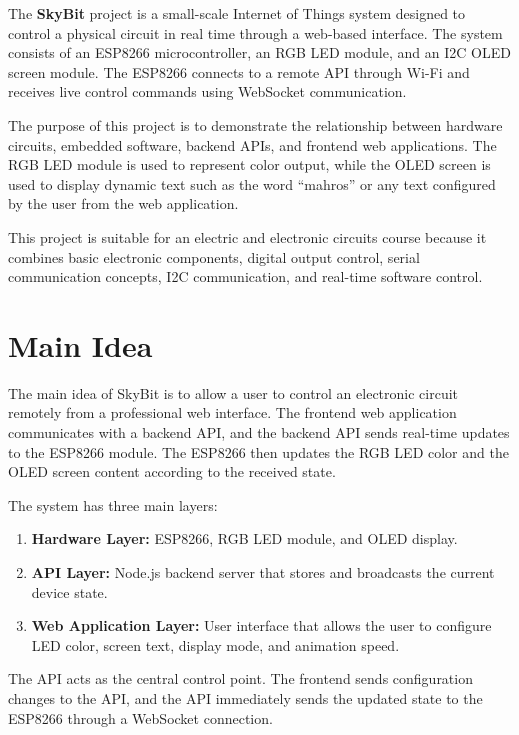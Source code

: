 \documentclass[12pt,a4paper]{report}
\begin{document}
The \textbf{SkyBit} project is a small-scale Internet of Things system designed to control a physical circuit in real time through a web-based interface. The system consists of an ESP8266 microcontroller, an RGB LED module, and an I2C OLED screen module. The ESP8266 connects to a remote API through Wi-Fi and receives live control commands using WebSocket communication.

The purpose of this project is to demonstrate the relationship between hardware circuits, embedded software, backend APIs, and frontend web applications. The RGB LED module is used to represent color output, while the OLED screen is used to display dynamic text such as the word ``mahros'' or any text configured by the user from the web application.

This project is suitable for an electric and electronic circuits course because it combines basic electronic components, digital output control, serial communication concepts, I2C communication, and real-time software control.

\chapter{Main Idea}

The main idea of SkyBit is to allow a user to control an electronic circuit remotely from a professional web interface. The frontend web application communicates with a backend API, and the backend API sends real-time updates to the ESP8266 module. The ESP8266 then updates the RGB LED color and the OLED screen content according to the received state.

The system has three main layers:

\begin{enumerate}[label=\textbf{\arabic*.}]
    \item \textbf{Hardware Layer:} ESP8266, RGB LED module, and OLED display.
    \item \textbf{API Layer:} Node.js backend server that stores and broadcasts the current device state.
    \item \textbf{Web Application Layer:} User interface that allows the user to configure LED color, screen text, display mode, and animation speed.
\end{enumerate}

The API acts as the central control point. The frontend sends configuration changes to the API, and the API immediately sends the updated state to the ESP8266 through a WebSocket connection.
\end{document}
